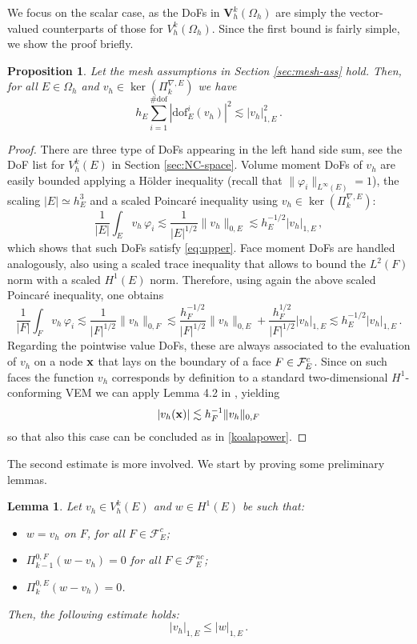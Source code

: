 \documentclass[a4paper,11pt]{article}
\newtheorem{proposition}[theorem]{Proposition}
\newtheorem{lemma}[theorem]{Lemma}
\theoremstyle{remark}
\theoremstyle{definition}
\newcounter{corr}
\newcommand{\PiNablaE}{\Pi^{\nabla,E}_k}
\newcommand{\PiZeroE}{\Pi^{0,E}_k}
\begin{document}
We focus on the scalar case, as the DoFs in $\mathbf{V}_h^k(\Omega_h)$ are simply the vector-valued counterparts of those for $V_h^k(\Omega_h)$.
Since the first bound is fairly simple, we show the proof briefly.
\begin{proposition}\label{prp:beirao-inequality}
Let the mesh assumptions in Section \ref{sec:mesh-ass} hold. 
Then, for all $E \in \Omega_h$ and $v_h \in \ker(\PiNablaE)$ we have
\begin{equation}\label{eq:upper}
h_E \sum_{i=1}^{\#\text{dof}} | \mathrm{dof}^i_E (v_h)|^2 \lesssim | v_h |_{1,E}^2 \, .
\end{equation}
\end{proposition}
\begin{proof}
There are three type of DoFs appearing in the left hand side sum, see the DoF list for $V^k_h(E)$ in Section \ref{sec:NC-space}. Volume moment DoFs of $v_h$ are easily bounded applying a H\"older inequality (recall that $\| \varphi_i\|_{L^\infty(E)}=1$), the scaling $|E| \simeq h_E^3$ and a scaled Poincar\'e inequality using $v_h \in \ker(\PiNablaE)$:
$$
\frac{1}{|E|} \int_E v_h \, \varphi_i \lesssim  \frac{1}{|E|^{1/2}} \| v_h \|_{0,E}
\lesssim h_E^{-1/2} |v_h|_{1,E} \, ,
$$
which shows that such DoFs satisfy \eqref{eq:upper}.
Face moment DoFs are handled analogously, also using a scaled trace inequality that allows to bound the $L^2(F)$ norm with a scaled $H^1(E)$ norm. Therefore, using again the above scaled Poincar\'e inequality, one obtains
\begin{equation}\label{koalapower}
\frac{1}{|F|} \int_F v_h \, \varphi_i \lesssim \frac{1}{|F|^{1/2}} \| v_h \|_{0,F}
\lesssim \frac{h_F^{-1/2}}{|F|^{1/2}} \| v_h \|_{0,E} + \frac{h_F^{1/2}}{|F|^{1/2}} | v_h |_{1,E} 
\lesssim h_E^{-1/2} |v_h|_{1,E} \, .
\end{equation}
Regarding the pointwise value DoFs, these are always associated to the evaluation of $v_h$ on a node ${\bf x}$ that lays on the boundary of a face $F \in {\cal F}^c_E$. Since on such faces the function $v_h$ corresponds by definition to a standard two-dimensional $H^1$-conforming VEM we can apply Lemma 4.2 in \cite{Chen-Huang:2018}, yielding 
$$
|v_h({\bf x})| \lesssim h_F^{-1} \| v_h \|_{0,F}
$$
so that also this case can be concluded as in \eqref{koalapower}.
%
\end{proof}

The second estimate is more involved. We start by proving some preliminary lemmas. 
\begin{lemma}\label{lem:w:prop}
Let $v_h \in V^k_h(E)$ and $w \in H^1(E)$ be such that:
\begin{itemize}
    \item $w = v_h$ on $F$, for all $F \in \mathcal{F}^c_E$;
    \item $\Pi^{0,F}_{k-1}(w - v_h) = 0$ for all $F \in \mathcal{F}^{nc}_E$;
    \item $\PiZeroE(w -v_h) = 0$.
\end{itemize}
Then, the following estimate holds:
\[
| v_h |_{1,E} \leq | w |_{1,E} \, .
\]
\end{lemma}
\end{document}
